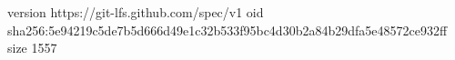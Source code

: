 version https://git-lfs.github.com/spec/v1
oid sha256:5e94219c5de7b5d666d49e1c32b533f95bc4d30b2a84b29dfa5e48572ce932ff
size 1557
